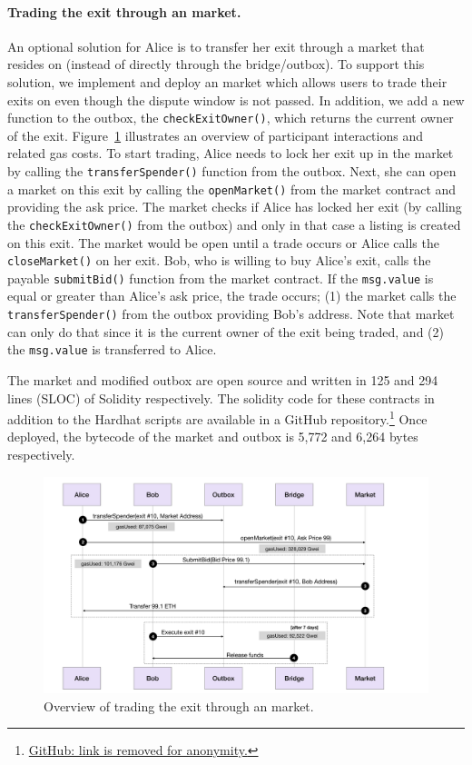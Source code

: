 \paragraph{Trading the exit through an \layerone market.} An optional solution for Alice is to transfer her exit through a market that resides on \layerone (instead of directly through the bridge/outbox). To support this solution, we implement and deploy an \layerone market which allows users to trade their exits on \layerone even though the dispute window is not passed. In addition, we add a new function to the \arb \nitro outbox, the \texttt{checkExitOwner()}, which returns the current owner of the exit. Figure~\ref{fig:marketflow} illustrates an overview of participant interactions and related gas costs. To start trading, Alice needs to lock her exit up in the market by calling the \texttt{transferSpender()} function from the outbox. Next, she can open a market on this exit by calling the \texttt{openMarket()} from the market contract and providing the ask price. The market checks if Alice has locked her exit (by calling the \texttt{checkExitOwner()} from the outbox) and only in that case a listing is created on this exit. The market would be open until a trade occurs or Alice calls the \texttt{closeMarket()} on her exit. Bob, who is willing to buy Alice's exit, calls the payable \texttt{submitBid()} function from the market contract. If the \texttt{msg.value} is equal or greater than Alice's ask price, the trade occurs; (1) the market calls the \texttt{transferSpender()} from the outbox providing Bob's address. Note that market can only do that since it is the current owner of the exit being traded, and (2) the \texttt{msg.value} is transferred to Alice.

The market and modified outbox are open source and written in 125 and 294 lines (SLOC) of Solidity respectively. The solidity code for these contracts in addition to the Hardhat scripts are available in a GitHub repository.\footnote{\href{https://}{GitHub: link is removed for anonymity.}} Once deployed, the bytecode of the market and outbox is 5,772 and 6,264 bytes respectively.

\begin{figure}[t]
	\includegraphics[width=1\textwidth]{figures/marketflow.pdf}
	\caption{Overview of trading the exit through an \layerone market.}
	\centering
	\label{fig:marketflow}
\end{figure}

